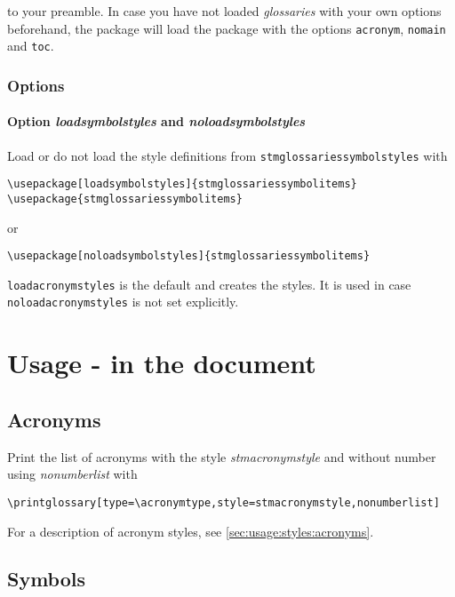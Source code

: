\documentclass{scrartcl}
\begin{document}
to your preamble. In case you have not loaded \textit{glossaries} with your own options beforehand, the package will load the package with the options \texttt{acronym}, \texttt{nomain} and \texttt{toc}.

\subsubsection{Options}

\paragraph{Option \protect\textit{loadsymbolstyles} and \protect\textit{noloadsymbolstyles}}

Load or do not load the style definitions from \texttt{stmglossariessymbolstyles} with

\begin{verbatim}
\usepackage[loadsymbolstyles]{stmglossariessymbolitems}
\usepackage{stmglossariessymbolitems}
\end{verbatim}

or

\begin{verbatim}
\usepackage[noloadsymbolstyles]{stmglossariessymbolitems}
\end{verbatim}

\texttt{loadacronymstyles} is the default and creates the styles. It is used in case \texttt{noloadacronymstyles} is not set explicitly.


\section{Usage - in the document}
\label{sec:usage:document}

\subsection{Acronyms}
\label{sec:usage:document:acronyms}

Print the list of acronyms with the style \textit{stmacronymstyle} and without number using \textit{nonumberlist} with

\begin{verbatim}
\printglossary[type=\acronymtype,style=stmacronymstyle,nonumberlist]
\end{verbatim}

For a description of acronym styles, see \autoref{sec:usage:styles:acronyms}.

\subsection{Symbols}
\label{sec:usage:document:symbols}
\end{document}

